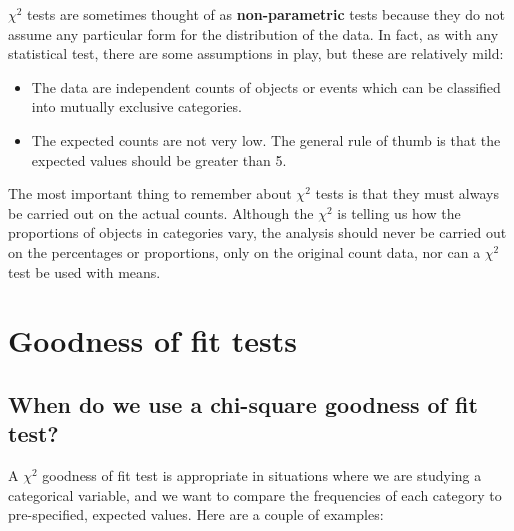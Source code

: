 \documentclass[
]{book}
\providecommand{\tightlist}{%
  \setlength{\itemsep}{0pt}\setlength{\parskip}{0pt}}
\begin{document}
\(\chi^{2}\) tests are sometimes thought of as \textbf{non-parametric} tests because they do not assume any particular form for the distribution of the data. In fact, as with any statistical test, there are some assumptions in play, but these are relatively mild:

\begin{itemize}
\tightlist
\item
  The data are independent counts of objects or events which can be classified into mutually exclusive categories.
\item
  The expected counts are not very low. The general rule of thumb is that the expected values should be greater than 5.
\end{itemize}

The most important thing to remember about \(\chi^{2}\) tests is that they must always be carried out on the actual counts. Although the \(\chi^{2}\) is telling us how the proportions of objects in categories vary, the analysis should never be carried out on the percentages or proportions, only on the original count data, nor can a \(\chi^{2}\) test be used with means.

\hypertarget{goodness-of-fit-tests}{%
\chapter{Goodness of fit tests}\label{goodness-of-fit-tests}}

\hypertarget{when-do-we-use-a-chi-square-goodness-of-fit-test}{%
\section{When do we use a chi-square goodness of fit test?}\label{when-do-we-use-a-chi-square-goodness-of-fit-test}}

A \(\chi^{2}\) goodness of fit test is appropriate in situations where we are studying a categorical variable, and we want to compare the frequencies of each category to pre-specified, expected values. Here are a couple of examples:
\end{document}
